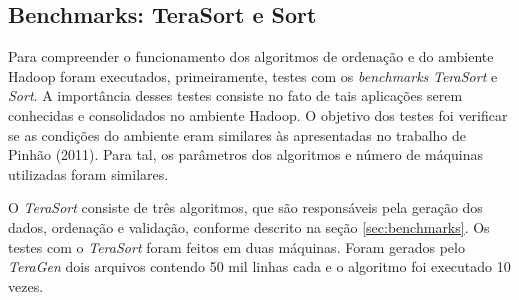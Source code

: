 \subsection{Benchmarks: TeraSort e Sort}

 
Para compreender o funcionamento dos algoritmos de ordenação e do ambiente Hadoop foram executados, primeiramente, testes com os \textit{benchmarks} \textit{TeraSort} e \textit{Sort}.  A importância desses testes consiste no fato de tais  aplicações serem conhecidas e consolidados no ambiente Hadoop. 
 O objetivo dos testes foi verificar se as condições do ambiente eram similares às apresentadas no trabalho de Pinhão (2011). Para tal, os parâmetros dos algoritmos e número de máquinas utilizadas foram similares. 


O \textit{TeraSort} consiste de três algoritmos, que são responsáveis pela geração dos dados, ordenação e validação, conforme descrito na seção \ref{sec:benchmarks}.
Os testes com o \textit{TeraSort} foram feitos em duas máquinas. Foram gerados pelo \textit{TeraGen} dois arquivos contendo 50 mil linhas cada e o algoritmo foi executado 10 vezes.

 



